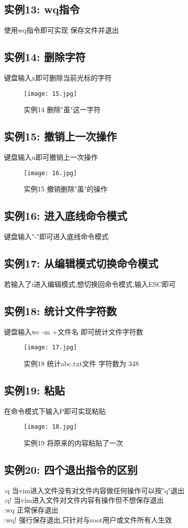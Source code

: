 \documentclass[a4paper, 12pt]{article}
\begin{document}
  \subsection{实例13: wq指令}
  使用wq指令即可实现 保存文件并退出
  \subsection{实例14: 删除字符}
  键盘输入x即可删除当前光标的字符
  \begin{figure}[h!]
    \centering
    \texttt{[image: 15.jpg]}
    \caption{实例14 删除"虽"这一字符}
  \end{figure}
  \subsection{实例15: 撤销上一次操作}
  键盘输入u即可撤销上一次操作
  \begin{figure}[h!]
    \centering
    \texttt{[image: 16.jpg]}
    \caption{实例15 撤销删除"虽"的操作}
    \end{figure}
    \subsection{实例16: 进入底线命令模式}
    键盘输入"-"即可进入底线命令模式
    \subsection{实例17: 从编辑模式切换命令模式}
    若输入了i进入编辑模式,想切换回命令模式,输入ESC即可
    \subsection{实例18: 统计文件字符数}
    键盘输入wc -m +文件名 即可统计文件字符数
    \begin{figure}[h!]
        \centering
        \texttt{[image: 17.jpg]}
        \caption{实例18 统计abc.txt文件 字符数为 348}
      \end{figure}
    \subsection{实例19: 粘贴}
    在命令模式下输入P即可实现粘贴
    \begin{figure}[h!]
        \centering
        \texttt{[image: 18.jpg]}
        \caption{实例19 将原来的内容粘贴了一次}
      \end{figure}
    \subsection{实例20: 四个退出指令的区别}
    \noindent :q  当vim进入文件没有对文件内容做任何操作可以按"q"退出 \\
    :q!  当vim进入文件对文件内容有操作但不想保存退出 \\
    :wq  正常保存退出 \\
    :wq! 强行保存退出,只针对与root用户或文件所有人生效 
\end{document}
